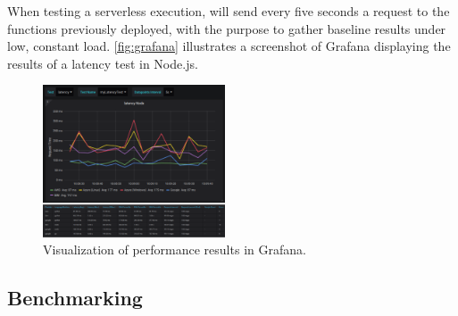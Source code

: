 When testing a serverless execution, \sys will send every five seconds a request to the functions previously deployed, with the purpose to gather baseline results under low, constant load. %
\autoref{fig:grafana} illustrates a screenshot of Grafana displaying the results of a latency test in Node.js. 

\begin{figure}[!t]
\begin{center}
\includegraphics[width=0.48\textwidth]{bilder/grafana_combined}
\caption{Visualization of performance results in Grafana.}
\label{fig:grafana}
\end{center}
\end{figure}




\subsection{Benchmarking}

